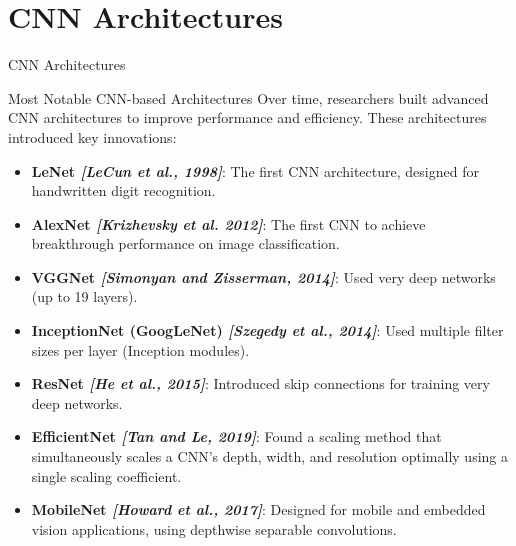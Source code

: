 \section{CNN Architectures}
\begin{frame}{}
    \LARGE CNN Architectures
\end{frame}

\begin{frame}{Most Notable CNN-based Architectures}
    Over time, researchers built advanced CNN architectures to improve performance and efficiency. These architectures introduced key innovations:
    {\small
    \begin{itemize}
        \item \textbf{LeNet \emph{[LeCun et al., 1998]}}: The first CNN architecture, designed for handwritten digit recognition.
        \item \textbf{AlexNet \emph{[Krizhevsky et al. 2012]}}:  The first CNN to achieve breakthrough performance on image classification.
        \item \textbf{VGGNet \emph{[Simonyan and Zisserman, 2014]}}: Used very deep networks (up to 19 layers).
        \item \textbf{InceptionNet (GoogLeNet) \emph{[Szegedy et al., 2014]}}: Used multiple filter sizes per layer (Inception modules).
        \item \textbf{ResNet \emph{[He et al., 2015]}}: Introduced skip connections for training very deep networks.
        \item \textbf{EfficientNet \emph{[Tan and Le, 2019]}}: Found a scaling method that  simultaneously scales a CNN’s depth, width, and resolution optimally using a single scaling coefficient.
        \item \textbf{MobileNet \emph{[Howard et al., 2017]}}: Designed for mobile and embedded vision applications, using depthwise separable convolutions.
    \end{itemize}
    }
\end{frame}









